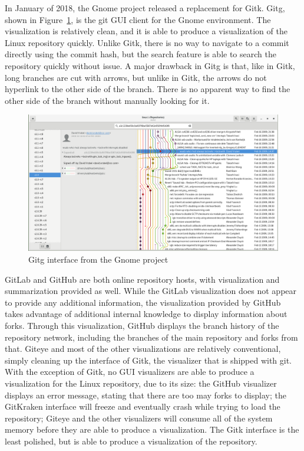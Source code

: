 In January of 2018, the Gnome project released a replacement for Gitk.
Gitg, shown in Figure~\ref{fig:gitg_screenshot}, is the git GUI client
for the Gnome environment. The visualization is relatively clean, and it
is able to produce a visualization of the Linux repository quickly.
Unlike Gitk, there is no way to navigate to a commit directly using the
commit hash, but the search feature is able to search the repository
quickly without issue. A major drawback in Gitg is that, like in Gitk,
long branches are cut with arrows, but unlike in Gitk, the arrows do not
hyperlink to the other side of the branch. There is no apparent way to
find the other side of the branch without manually looking for it.

\begin{figure}[htpb]
  \centering
  \includegraphics[width=0.8\linewidth]{Figures/introduction/gitg.png}
  \caption{Gitg interface from the Gnome project}
  \label{fig:gitg_screenshot}
\end{figure}


GitLab and GitHub are both online repository hosts, with
visualization and summarization provided as well. While the GitLab
visualization does not appear to provide any additional information, the
visualization provided by GitHub takes advantage of additional internal
knowledge to display information about forks. Through this
visualization, GitHub displays the branch history of the repository
network, including the branches of the main repository and forks from
that. Giteye and most of the other visualizations are relatively
conventional, simply cleaning up the interface of Gitk, the visualizer
that is shipped with git. With the exception of Gitk, no GUI visualizers
are able to produce a visualization for the Linux repository, due to its
size: the GitHub visualizer displays an error message, stating that
there are too may forks to display; the GitKraken interface will freeze
and eventually crash while trying to load the repository; Giteye
and the other visualizers will consume all of the system memory before
they are able to produce a visualization. The Gitk interface is the
least polished, but is able to produce a visualization of the
repository.

